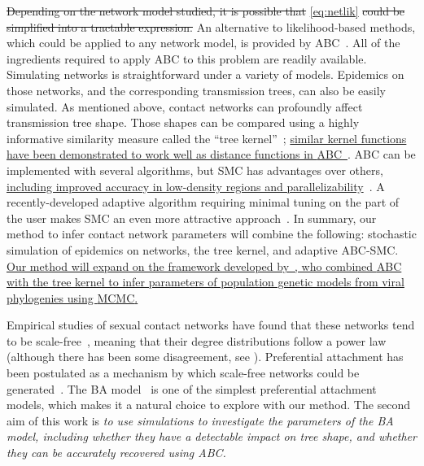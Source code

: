 {\color{red}\sout{Depending on the network model studied, it is possible that}
\cref{eq:netlik} \sout{could be simplified into a tractable expression.}}
An alternative to likelihood-based methods, which could be applied to any
network model, is provided by \gls{ABC}~\autocite{rubin1984bayesianly,
tavare1997inferring, fu1997estimating, beaumont2002approximate}. All of the
ingredients required to apply \gls{ABC} to this problem are readily available.
Simulating networks is straightforward under a variety of models. Epidemics on
those networks, and the corresponding transmission trees, can also be easily
simulated. As mentioned above, contact networks can profoundly affect
transmission tree shape. Those shapes can be compared using a highly
informative similarity measure called the ``tree
kernel''~\autocite{poon2013mapping}; {\color{blue}\uline{similar kernel
functions have been demonstrated to work well as distance functions in
\gls{ABC}~\autocite{park2015k2}}}. \Gls{ABC} can be implemented with several
algorithms, but \gls{SMC} has advantages over others,
{\color{blue}\uline{including improved accuracy in low-density regions and
parallelizability}}~\autocite{mckinley2009inference}. A recently-developed
adaptive algorithm requiring minimal tuning on the part of the user makes
\gls{SMC} an even more attractive approach~\autocite{del2012adaptive}. In
summary, our method to infer contact network parameters will combine the
following: stochastic simulation of epidemics on networks, the tree kernel, and
adaptive \gls{ABC}-\gls{SMC}. {\color{blue}\uline{ Our method will expand on
the framework developed by~\autocite{poon2015phylodynamic}, who combined
\gls{ABC} with the tree kernel to infer parameters of population genetic models
from viral phylogenies using \gls{MCMC}. }}

Empirical studies of sexual contact networks have found that these networks
tend to be scale-free~\autocite{colgate1989risk, liljeros2001web,
schneeberger2004scale,clemenccon2015statistical}, meaning that their degree
distributions follow a power law (although there has been some disagreement,
see \autocite{handcock2004likelihood, bansal2007individual}). Preferential
attachment has been postulated as a mechanism by which scale-free networks
could be generated~\autocite{barabasi1999emergence}. The \gls{BA}
model~\autocite{barabasi1999emergence} is one of the simplest preferential
attachment models, which makes it a natural choice to explore with our method.
The second aim of this work is \emph{to use simulations to investigate the
parameters of the \acrlong{BA} model, including whether they have a detectable
impact on tree shape, and whether they can be accurately recovered using
\gls{ABC}.}

